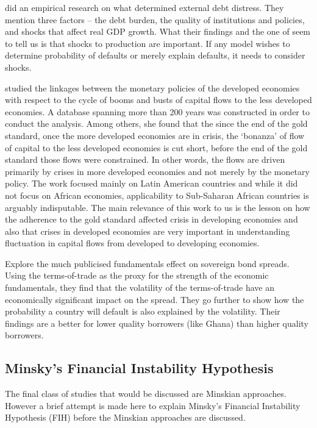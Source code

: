 \documentclass[12pt, a4paper]{article}
\begin{document}
	 did an empirical research on what determined external debt distress. They mention three factors -- the debt burden, the quality of institutions and policies, and shocks that affect real GDP growth. What their findings and the one of  seem to tell us is that shocks to production are important. If any model wishes to determine probability of defaults or merely explain defaults, it needs to consider shocks. %
			
	
	 studied the linkages between the monetary policies of the developed economies with respect to the cycle of booms and busts of capital flows to the less developed economies. A database spanning more than 200 years was constructed in order to conduct the analysis. Among others, she found that the since the end of the gold standard, once the more developed economies are in crisis, the `bonanza' of flow of capital to the less developed economies is cut short, before the end of the gold standard those flows were constrained. In other words, the flows are driven primarily by crises in more developed economies and not merely by the monetary policy. The work focused mainly on Latin American countries and while it did not focus on African economies, applicability to Sub-Saharan African countries is arguably indisputable. The main relevance of this work to us is the lesson on how the adherence to the gold standard affected crisis in developing economies and also that crises in developed economies are very important in understanding fluctuation in capital flows from developed to developing economies.
	
	\cite{Jens2010} Explore the much publicised fundamentals effect on sovereign bond spreads. Using the terms-of-trade as the proxy for the strength of the economic fundamentals, they find that the volatility of the terms-of-trade have an economically significant impact on the spread. They go further to show how the probability a country will default is also explained by the volatility. Their findings are a better for lower quality borrowers (like Ghana) than higher quality borrowers.
	
	\subsection{Minsky's Financial Instability Hypothesis}
	The final class of studies that would be discussed are Minskian approaches. However a brief attempt is made here to explain Minsky's Financial Instability Hypothesis (FIH) before the Minskian approaches are discussed.
	
\end{document}

